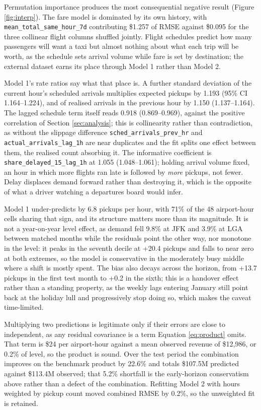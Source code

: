 \documentclass[11pt]{article}
\begin{document}
Permutation importance produces the most consequential negative result (Figure
\ref{fig:interp}). The fare model is dominated by its own history, with
\texttt{mean\_total\_same\_hour\_7d} contributing \$1.257 of RMSE against \$0.095
for the three collinear flight columns shuffled jointly. Flight schedules predict
how many passengers will want a taxi but almost nothing about what each trip will
be worth, as the schedule sets arrival volume while fare is set by destination;
the external dataset earns its place through Model 1 rather than Model 2.
 
Model 1's rate ratios say what that place is. A further standard deviation of the
current hour's scheduled arrivals multiplies expected pickups by 1.193 (95\% CI
1.164--1.224), and of realised arrivals in the previous hour by 1.150
(1.137--1.164). The lagged schedule term itself reads 0.918 (0.869--0.969),
against the positive correlation of Section \ref{sec:analysis}; this is
collinearity rather than contradiction, as without the slippage difference
\texttt{sched\_arrivals\_prev\_hr} and \texttt{actual\_arrivals\_lag\_1h} are near
duplicates and the fit splits one effect between them, the realised count
absorbing it. The informative coefficient is \texttt{share\_delayed\_15\_lag\_1h}
at 1.055 (1.048--1.061); holding arrival volume fixed, an hour in which more
flights ran late is followed by \emph{more} pickups, not fewer. Delay displaces
demand forward rather than destroying it, which is the opposite of what a driver
watching a departures board would infer.
 
Model 1 under-predicts by 6.8 pickups per hour, with 71\% of the 48 airport-hour
cells sharing that sign, and its structure matters more than its magnitude. It is
not a year-on-year level effect, as demand fell 9.8\% at JFK and 3.9\% at LGA
between matched months while the residuals point the other way, nor monotone in
the level: it peaks in the seventh decile at +20.4 pickups and falls to near zero
at both extremes, so the model is conservative in the moderately busy middle
where a shift is mostly spent. The bias also decays across the horizon, from
+13.7 pickups in the first test month to +0.2 in the sixth; this is a handover
effect rather than a standing property, as the weekly lags entering January still
point back at the holiday lull and progressively stop doing so, which makes the
caveat time-limited.
 
Multiplying two predictions is legitimate only if their errors are close to
independent, as any residual covariance is a term Equation \ref{eq:product}
omits. That term is \$24 per airport-hour against a mean observed revenue of
\$12,986, or 0.2\% of level, so the product is sound. Over the test period the
combination improves on the benchmark product by 22.6\% and totals \$107.5M
predicted against \$113.4M observed; that 5.2\% shortfall is the early-horizon
conservatism above rather than a defect of the combination. Refitting Model 2
with hours weighted by pickup count moved combined RMSE by 0.2\%, so the
unweighted fit is retained.
 
\end{document}
